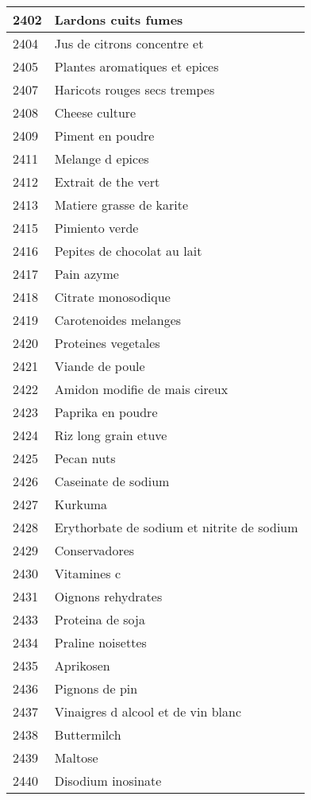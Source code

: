 \begin{longtable}{|l|l|}
2402 & Lardons cuits fumes \\ \hline 
2404 & Jus de citrons concentre et \\ \hline 
2405 & Plantes aromatiques et epices \\ \hline 
2407 & Haricots rouges secs trempes \\ \hline 
2408 & Cheese culture \\ \hline 
2409 & Piment en poudre \\ \hline 
2411 & Melange d epices \\ \hline 
2412 & Extrait de the vert \\ \hline 
2413 & Matiere grasse de karite \\ \hline 
2415 & Pimiento verde \\ \hline 
2416 & Pepites de chocolat au lait \\ \hline 
2417 & Pain azyme \\ \hline 
2418 & Citrate monosodique \\ \hline 
2419 & Carotenoides melanges \\ \hline 
2420 & Proteines vegetales \\ \hline 
2421 & Viande de poule \\ \hline 
2422 & Amidon modifie de mais cireux \\ \hline 
2423 & Paprika en poudre \\ \hline 
2424 & Riz long grain etuve \\ \hline 
2425 & Pecan nuts \\ \hline 
2426 & Caseinate de sodium \\ \hline 
2427 & Kurkuma \\ \hline 
2428 & Erythorbate de sodium et nitrite de sodium \\ \hline 
2429 & Conservadores \\ \hline 
2430 & Vitamines c \\ \hline 
2431 & Oignons rehydrates \\ \hline 
2433 & Proteina de soja \\ \hline 
2434 & Praline noisettes \\ \hline 
2435 & Aprikosen \\ \hline 
2436 & Pignons de pin \\ \hline 
2437 & Vinaigres d alcool et de vin blanc \\ \hline 
2438 & Buttermilch \\ \hline 
2439 & Maltose \\ \hline 
2440 & Disodium inosinate \\ \hline 

\end{longtable}
